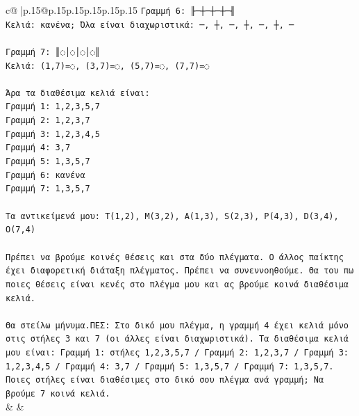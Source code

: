 \documentclass{article}
\begin{document}
{\begin{supertabular}{c@{$\;$}|p{.15\linewidth}@{}p{.15\linewidth}p{.15\linewidth}p{.15\linewidth}p{.15\linewidth}p{.15\linewidth}}
{{{\texttt{Γραμμή 6: ╟─┼─┼─┼─╢} \\
\texttt{Κελιά: κανένα; Όλα είναι διαχωριστικά: ─, ┼, ─, ┼, ─, ┼, ─} \\
\\ 
\texttt{Γραμμή 7: ║◌│◌│◌│◌║} \\
\texttt{Κελιά: (1,7)=◌, (3,7)=◌, (5,7)=◌, (7,7)=◌} \\
\\ 
\texttt{Άρα τα διαθέσιμα κελιά είναι:} \\
\texttt{Γραμμή 1: 1,2,3,5,7} \\
\texttt{Γραμμή 2: 1,2,3,7} \\
\texttt{Γραμμή 3: 1,2,3,4,5} \\
\texttt{Γραμμή 4: 3,7} \\
\texttt{Γραμμή 5: 1,3,5,7} \\
\texttt{Γραμμή 6: κανένα} \\
\texttt{Γραμμή 7: 1,3,5,7} \\
\\ 
\texttt{Τα αντικείμενά μου: T(1,2), M(3,2), A(1,3), S(2,3), P(4,3), D(3,4), O(7,4)} \\
\\ 
\texttt{Πρέπει να βρούμε κοινές θέσεις και στα δύο πλέγματα. Ο άλλος παίκτης έχει διαφορετική διάταξη πλέγματος. Πρέπει να συνεννοηθούμε. Θα του πω ποιες θέσεις είναι κενές στο πλέγμα μου και ας βρούμε κοινά διαθέσιμα κελιά.} \\
\\ 
\texttt{Θα στείλω μήνυμα.ΠΕΣ: Στο δικό μου πλέγμα, η γραμμή 4 έχει κελιά μόνο στις στήλες 3 και 7 (οι άλλες είναι διαχωριστικά). Τα διαθέσιμα κελιά μου είναι: Γραμμή 1: στήλες 1,2,3,5,7 / Γραμμή 2: 1,2,3,7 / Γραμμή 3: 1,2,3,4,5 / Γραμμή 4: 3,7 / Γραμμή 5: 1,3,5,7 / Γραμμή 7: 1,3,5,7. Ποιες στήλες είναι διαθέσιμες στο δικό σου πλέγμα ανά γραμμή; Να βρούμε 7 κοινά κελιά.} \\
            }
        }
    }
    & & \\ \\


\end{supertabular}}
\end{document}
